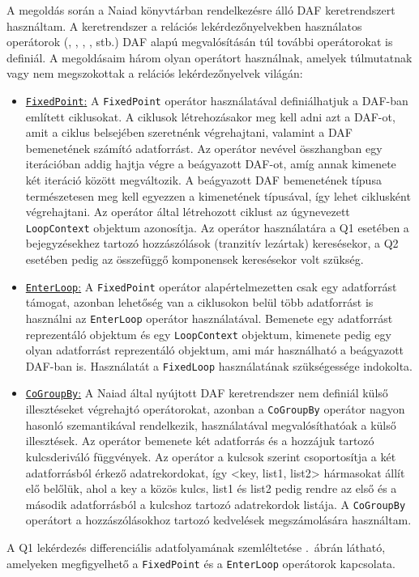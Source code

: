 A megoldás során a Naiad könyvtárban rendelkezésre álló DAF keretrendszert használtam. A keretrendszer a relációs lekérdezőnyelvekben használatos operátorok (, , , ,  stb.) DAF alapú megvalósításán túl további operátorokat is definiál. A megoldásaim három olyan operátort használnak, amelyek túlmutatnak vagy nem megszokottak a relációs lekérdezőnyelvek világán:
\begin{itemize}
	\item \uline{\texttt{FixedPoint}:} A \texttt{FixedPoint} operátor használatával definiálhatjuk a DAF-ban említett ciklusokat. A ciklusok létrehozásakor meg kell adni azt a DAF-ot, amit a ciklus belsejében szeretnénk végrehajtani, valamint a DAF bemenetének számító adatforrást. Az operátor nevével összhangban egy iterációban addig hajtja végre a beágyazott DAF-ot, amíg annak kimenete két iteráció között megváltozik. A beágyazott DAF bemenetének típusa természetesen meg kell egyezzen a kimenetének típusával, így lehet ciklusként végrehajtani. Az operátor által létrehozott ciklust az úgynevezett \texttt{LoopContext} objektum azonosítja. Az operátor használatára a Q1 esetében a bejegyzésekhez tartozó hozzászólások (tranzitív lezártak) keresésekor, a Q2 esetében pedig az összefüggő komponensek keresésekor volt szükség.
	\item \uline{\texttt{EnterLoop}:} A \texttt{FixedPoint} operátor alapértelmezetten csak egy adatforrást támogat, azonban lehetőség van a ciklusokon belül több adatforrást is használni az \texttt{EnterLoop} operátor használatával. Bemenete egy adatforrást reprezentáló objektum és egy \texttt{LoopContext} objektum, kimenete pedig egy olyan adatforrást reprezentáló objektum, ami már használható a beágyazott DAF-ban is. Használatát a \texttt{FixedLoop} használatának szükségessége indokolta.
	\item \uline{\texttt{CoGroupBy}:} A Naiad által nyújtott DAF keretrendszer nem definiál külső illesztéseket végrehajtó operátorokat, azonban a \texttt{CoGroupBy} operátor nagyon hasonló szemantikával rendelkezik, használatával megvalósíthatóak a külső illesztések. Az operátor bemenete két adatforrás és a hozzájuk tartozó kulcsderiváló függvények. Az operátor a kulcsok szerint csoportosítja a két adatforrásból érkező adatrekordokat, így \textsf{<key, list1, list2>} hármasokat állít elő belőlük, ahol a \textsf{key} a közös kulcs, \textsf{list1} és \textsf{list2} pedig rendre az első és a második adatforrásból a  kulcshoz tartozó adatrekordok listája. A \texttt{CoGroupBy} operátort a hozzászólásokhoz tartozó kedvelések megszámolására használtam.
\end{itemize}
A Q1 lekérdezés differenciális adatfolyamának szemléltetése .~ábrán látható, amelyeken megfigyelhető a \texttt{FixedPoint} és a \texttt{EnterLoop} operátorok kapcsolata.